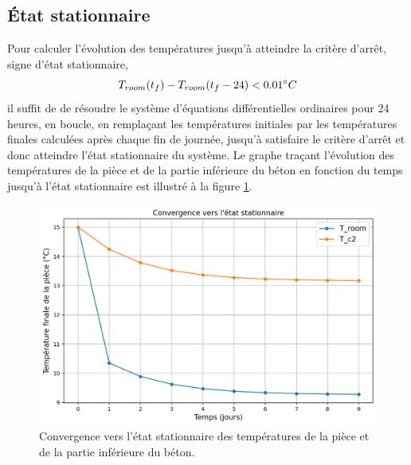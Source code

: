 \documentclass[12pt]{article}
\begin{document}
    \subsection{État stationnaire}\label{section:EtatStationnaire}
        Pour calculer l'évolution des températures jusqu'à atteindre la critère d'arrêt, signe d'état stationnaire,
        \begin{equation}
            T_{room}(t_f) - T_{room}(t_f - 24) < 0.01\degree C
        \end{equation}
        il suffit de de résoudre le système d'équations différentielles ordinaires pour 24 heures, en boucle, en remplaçant les températures initiales par les températures finales calculées après chaque fin de journée, jusqu'à satisfaire le critère d'arrêt et donc atteindre l'état stationnaire du système. Le graphe traçant l’évolution des températures de la pièce et de la partie inférieure du béton en fonction du temps jusqu’à l’état stationnaire est illustré à la figure \ref{fig:convergence}.
        \begin{figure}
            \centering
            \includegraphics[width=0.91\linewidth]{Rapport/figures/Convergence.png}
            \caption{Convergence vers l'état stationnaire des températures de la pièce et de la partie inférieure du béton.}
            \label{fig:convergence}
        \end{figure}
\end{document}
